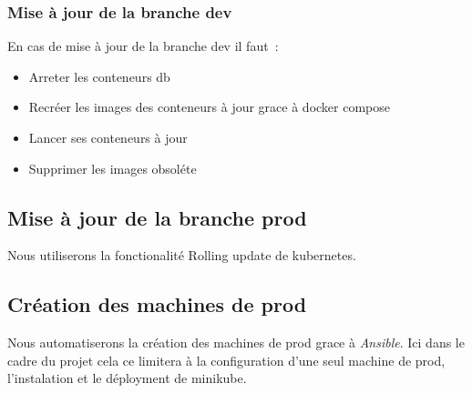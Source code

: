 \subsubsection{Mise à jour de la branche dev}
En cas de mise à jour de la branche dev il faut~:
\begin{itemize}
\item Arreter les conteneurs db
\item Recréer les images des conteneurs à jour grace à docker compose
\item Lancer ses conteneurs à jour
\item Supprimer les images obsoléte
\end{itemize}

\subsection{Mise à jour de la branche prod}
Nous utiliserons la fonctionalité Rolling update de kubernetes.

\subsection{Création des machines de prod}
Nous automatiserons la création des machines de prod grace à \emph{Ansible}.
Ici dans le cadre du projet cela ce limitera à la configuration d'une seul machine de prod, l'instalation et le déployment de minikube.


